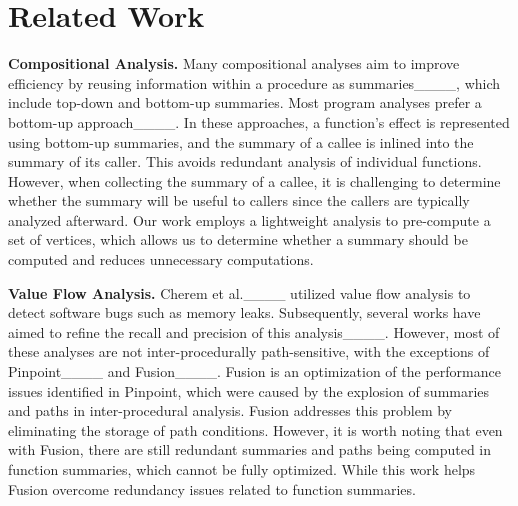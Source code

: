 \section{Related Work}
\textbf{Compositional Analysis.}
Many compositional analyses aim to improve efficiency by reusing information within a procedure as summaries____, which include top-down and bottom-up summaries.
Most program analyses prefer a bottom-up approach____. 
In these approaches, a function's effect is represented using bottom-up summaries, and the summary of a callee is inlined into the summary of its caller. 
This avoids redundant analysis of individual functions.
However, when collecting the summary of a callee, it is challenging to determine whether the summary will be useful to callers since the callers are typically analyzed afterward. 
Our work employs a lightweight analysis to pre-compute a set of vertices, which allows us to determine whether a summary should be computed and reduces unnecessary computations.


\textbf{Value Flow Analysis.}
Cherem et al.____ utilized value flow analysis to detect software bugs such as memory leaks. 
Subsequently, several works have aimed to refine the recall and precision of this analysis____. 
However, most of these analyses are not inter-procedurally path-sensitive, with the exceptions of Pinpoint____ and Fusion____.
Fusion is an optimization of the performance issues identified in Pinpoint, which were caused by the explosion of summaries and paths in inter-procedural analysis. Fusion addresses this problem by eliminating the storage of path conditions. 
However, it is worth noting that even with Fusion, there are still redundant summaries and paths being computed in function summaries, which cannot be fully optimized.
While this work helps Fusion overcome redundancy issues related to function summaries.

